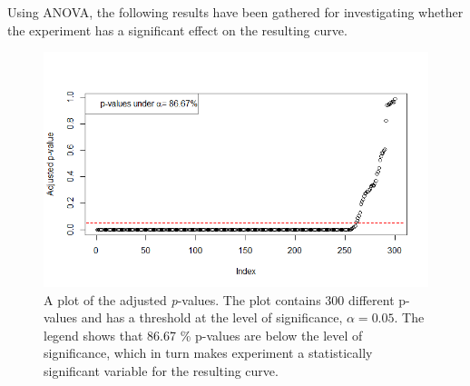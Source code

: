 \documentclass[11pt, fleqn, titlepage]{article}
\begin{document}
\noindent Using ANOVA, the following results have been gathered for investigating whether the experiment has a significant effect on the resulting curve.

\begin{figure}[H]
	\centering
	\includegraphics[width=0.7\linewidth]{billeder/pvals_res.png}
	\caption{A plot of the adjusted \textit{p}-values. The plot contains 300 different p-values and has a threshold at the level of significance, $ \alpha = 0.05 $. The legend shows that 86.67 \% p-values  are below the level of significance, which in turn makes experiment a statistically significant variable for the resulting curve. }
	\label{fig:pvalsres}
\end{figure}




\end{document}
